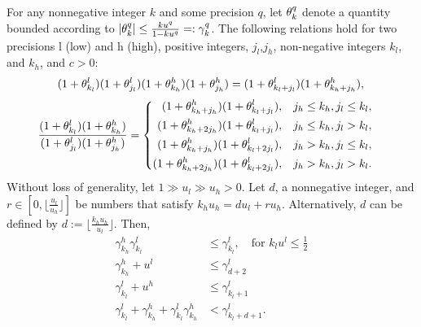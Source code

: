 \begin{lemma}
	\label{lem:mp}
	For any nonnegative integer $k$ and some precision $q$, let $\theta^{q}_{k}$ denote a quantity bounded according to $|\theta^q_{k}|\leq \frac{k u^q }{1-ku^q} =:\gamma^{q}_{k}$.
	The following relations hold for two precisions l (low) and h (high), positive integers, $j_{l}$,$j_{h}$, non-negative integers $k_{l}$, and $k_{h}$, and $c>0$:
	\begin{equation}
	(1+\theta^{l}_{k_{l}})(1+\theta^{l}_{j_{l}})(1+\theta^{h}_{k_{h}})(1+\theta^{h}_{j_{h}})=(1+\theta^{l}_{k_{l}+j_{l}})(1+\theta^{h}_{k_{h}+j_{h}}), \\
	\end{equation}
	\begin{align}
	\frac{(1+\theta^{l}_{k_{l}})(1+\theta^{h}_{k_{h}})}{(1+\theta^{l}_{j_{l}})(1+\theta^{h}_{j_{h}})} &=\left\{\begin{alignedat}{2}
	(1+\theta^{h}_{k_{h}+j_{h}})(1+\theta^{l}_{k_{l}+j_{l}})&,\quad& j_{h} \leq k_{h}, j_{l} \leq k_{l},\\
	(1+\theta^{h}_{k_{h}+2j_{h}})(1+\theta^{l}_{k_{l}+j_{l}})&,\quad& j_{h} \leq k_{h}, j_{l} > k_{l},\\
	(1+\theta^{h}_{k_{h}+j_{h}})(1+\theta^{l}_{k_{l}+2j_{l}})&,\quad& j_{h} > k_{h}, j_{l} \leq k_{l},\\
	(1+\theta^{h}_{k_{h}+2j_{h}})(1+\theta^{l}_{k_{l}+2j_{l}})&,\quad& j_{h} > k_{h}, j_{l} > k_{l}.
	\end{alignedat}\right.
	\end{align}
	Without loss of generality, let $1 \gg u_{l} \gg u_{h}>0$.
	Let $d$, a nonnegative integer, and $r\in[0, \lfloor\frac{u_l}{u_h}\rfloor]$ be numbers that satisfy $k_{h}u_h = d u_l + r u_h$. 
	Alternatively, $d$ can be defined by $d := \lfloor\frac{k_{h}u_h}{u_l}\rfloor$.
	Then,
	\begin{align}
	\gamma^{h}_{k_{h}}\gamma^{l}_{k_{l}} &\leq \gamma^{l}_{k_{l}}, \quad\text{for } k_{l} u^l \leq \frac{1}{2}  \\
	\gamma^{h}_{k_{h}}+u^l &\leq \gamma^{l}_{d+2} \\
	\gamma^{l}_{k_{l}} + u^{h} &\leq \gamma^{l}_{k_{l}+1} \\ %
	\gamma^{l}_{k_{l}}+\gamma^{h}_{k_{h}}+\gamma^{l}_{k_{l}}\gamma^{h}_{k_{h}} & < \gamma^{l}_{k_{l}+ d+ 1}. \label{eqn:mp1}
	\end{align} 
\end{lemma}
